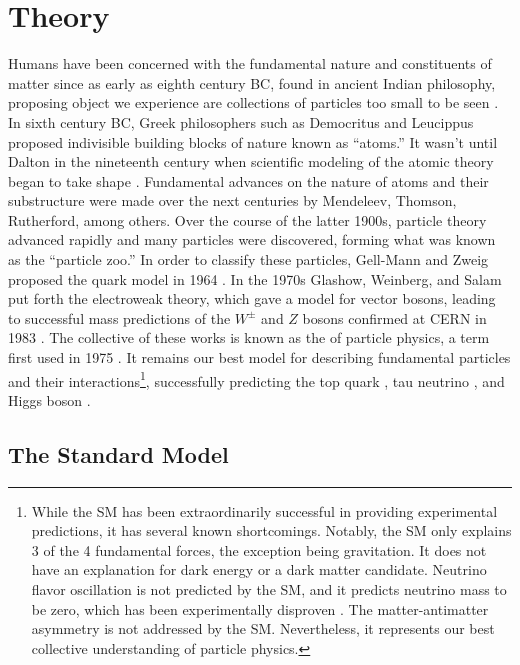 \chapter{Theory}

    Humans have been concerned with the fundamental nature and constituents of matter since as early as eighth century BC, found in ancient Indian philosophy, proposing object we experience are collections of particles too small to be seen \cite{indian-atomism}. In sixth century BC, Greek philosophers such as Democritus and Leucippus proposed indivisible building blocks of nature known as ``atoms.'' It wasn't until Dalton in the nineteenth century when scientific modeling of the atomic theory began to take shape \cite{dalton}. Fundamental advances on the nature of atoms and their substructure were made over the next centuries by Mendeleev, Thomson, Rutherford, among others. Over the course of the latter 1900s, particle theory advanced rapidly and many particles were discovered, forming what was known as the ``particle zoo.'' In order to classify these particles, Gell-Mann and Zweig proposed the quark model in 1964 \cite{quark-model}. In the 1970s Glashow, Weinberg, and Salam put forth the electroweak theory, which gave a model for vector bosons, leading to successful mass predictions of the $W^{\pm}$ and $Z$ bosons confirmed at \gls{CERN} in 1983 \cite{w-discovery, z-discovery}. The collective of these works is known as the  of particle physics, a term first used in 1975 \cite{conceptual-developments-text}. It remains our best model for describing fundamental particles and their interactions\footnote{While the \gls{SM} has been extraordinarily successful in providing experimental predictions, it has several known shortcomings. Notably, the \gls{SM} only explains 3 of the 4 fundamental forces, the exception being gravitation. It does not have an explanation for dark energy or a dark matter candidate. Neutrino flavor oscillation is not predicted by the \gls{SM}, and it predicts neutrino mass to be zero, which has been experimentally disproven \cite{neutrino-oscillation}. The matter-antimatter asymmetry is not addressed by the \gls{SM}. Nevertheless, it represents our best collective understanding of particle physics.}, successfully predicting the top quark \cite{top-quark}, tau neutrino \cite{tau-neutrino}, and Higgs boson \cite{higgs-discovery-atlas,higgs-discovery-cms}.
    

    \section{The Standard Model}

